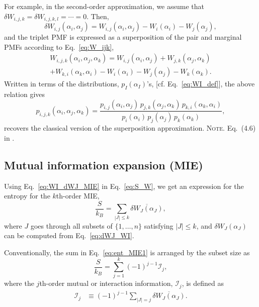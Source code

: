 \documentclass[reprint, superscriptaddress]{revtex4-1}
\newcommand{\note}[1]{{\color{DarkGreen}\footnotesize \textsc{Note.} #1}}
\newcommand{\MI}{\mathcal I} %
\begin{document}
For example,
in the second-order approximation,
we assume that
$\delta W_{i, j, k} = \delta W_{i,j,k, l} = \cdots = 0$.
%
Then,
$$\delta W_{i, j}(\alpha_i, \alpha_j)
= W_{i,j}(\alpha_i, \alpha_j) - W_i(\alpha_i) - W_j(\alpha_j),$$
and the triplet PMF is expressed as a superposition
of the pair and marginal PMFs according to Eq.~\eqref{eq:W_ijk},
\begin{align*}
W_{i,j,k}(\alpha_i, \alpha_j, \alpha_k)
=
W_{i,j}(\alpha_i, \alpha_j) + W_{j,k}(\alpha_j, \alpha_k)\\
  + W_{k,i}(\alpha_k, \alpha_i)
  - W_i(\alpha_i) - W_j(\alpha_j) - W_k(\alpha_k)
.
\end{align*}
%
Written in terms of the distributions, $p_I(\alpha_I)$'s,
[cf. Eq.~\eqref{eq:WI_def}], the above relation gives
%
$$
p_{i,j,k}(\alpha_i, \alpha_j, \alpha_k)
=
\frac{ p_{i,j}(\alpha_i, \alpha_j) \, p_{j,k}(\alpha_j, \alpha_k) \, p_{k,i}(\alpha_k, \alpha_i) }{ p_i(\alpha_i) \, p_j(\alpha_j) \, p_k(\alpha_k) }
,
$$
recovers the classical version of the superposition approximation\cite{kirkwood1935, born1946}.
\note{Eq.~(4.6) in \cite{born1946}.}

\subsection{Mutual information expansion (MIE)}


Using Eq.~\eqref{eq:WI_dWJ_MIE} in Eq.~\eqref{eq:S_W},
we get an expression for the entropy for the $k$th-order MIE,
\begin{equation}
  \frac{S}{k_B}
  =
  \sum_{|J| \le k} \overline{ \delta W_J(\alpha_J) },
  \label{eq:ent_MIE1}
\end{equation}
where $J$ goes through all subsets of $\{1, \dots, n\}$ satisfying $|J| \le k$,
and $\delta W_J(\alpha_J)$ can be computed from Eq.~\eqref{eq:dWJ_WI}.

Conventionally, the sum in Eq.~\eqref{eq:ent_MIE1}
is arranged by the subset size as
\begin{equation}
  \frac{S}{k_B}
  =
  \sum_{j = 1}^k (-1)^{j-1} \MI_j
  ,
  \label{eq:S_MIE}
\end{equation}
%
where the $j$th-order mutual or interaction information, $\MI_j$, is defined as
\begin{align}
  \MI_j
  &\equiv (-1)^{j-1} \sum_{|J| = j} \overline{ \delta W_J(\alpha_J) }
  .
  \label{eq:MI_comb}
\end{align}
%
\end{document}
